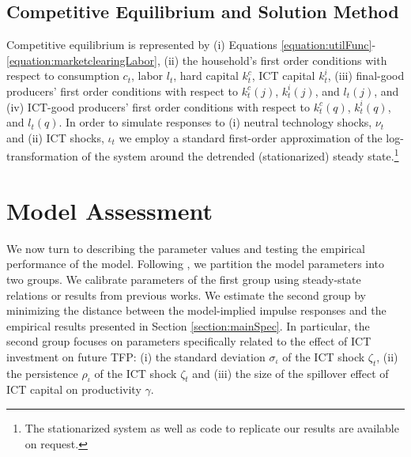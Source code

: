 \documentclass[12pt]{article}
\begin{document}
\subsection{Competitive Equilibrium and Solution Method}

Competitive equilibrium is represented by (i) Equations \ref{equation:utilFunc}-\ref{equation:marketclearingLabor}, (ii) the household's first order conditions with respect to consumption $c_t$, labor $l_t$, hard capital $k^c_t$, ICT capital $k^i_t$, (iii) final-good producers' first order conditions with respect to $k^c_{t}(j)$, $k^i_{t}(j)$, and $l_{t}(j)$, and (iv) ICT-good producers' first order conditions with respect to $k^c_{t}(q)$, $k^i_{t}(q)$, and $l_{t}(q)$. In order to simulate responses to (i) neutral technology shocks, $\nu_t$ and (ii) ICT shocks, $\iota_t$ we employ a standard first-order approximation of the log-transformation of the system around the detrended (stationarized) steady state.\footnote{The stationarized system as well as code to replicate our results are available on request.} 


\section{Model Assessment}\label{section:model_assessment}

We now turn to describing the parameter values and testing the empirical performance of the model. Following \cite{christiano2005nominal}, we partition the model parameters into two groups. We calibrate parameters of the first group using steady-state relations or results from previous works. We estimate the second group by minimizing the distance between the model-implied impulse responses and the empirical results presented in Section \ref{section:mainSpec}. In particular, the second group focuses on parameters specifically related to the effect of ICT investment on future TFP: (i) the standard deviation $\sigma_{\iota}$ of the ICT shock $\zeta_t$, (ii) the persistence $\rho_{\iota}$ of the ICT shock $\zeta_t$ and (iii) the size of the spillover effect of ICT capital on productivity $\gamma$. 
\end{document}
